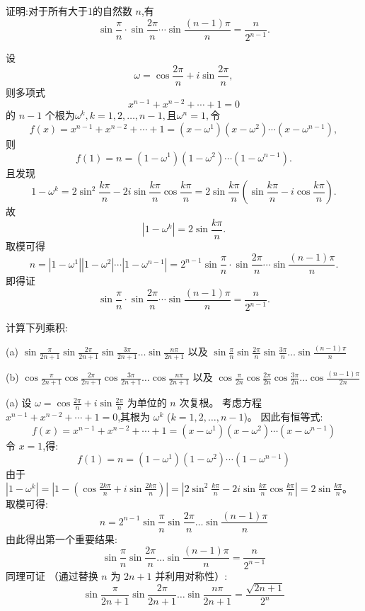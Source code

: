 \begin{questions}
    \question 证明:对于所有大于1的自然数 $n$,有
    \[
    \sin \frac{\pi}{n} \cdot \sin \frac{2\pi}{n} \cdots \sin \frac{(n-1)\pi}{n} = \frac{n}{2^{n-1}}.
    \]
    \begin{solution}
        设
        \[
        \omega = \cos \frac{2\pi}{n} + i \sin \frac{2\pi}{n},
        \]
        则多项式
        \[
        x^{n-1} + x^{n-2} + \cdots + 1 = 0
        \]的 $n-1$ 个根为$\omega^k, k=1,2,\dots,n-1,$且$\omega^n = 1,$令
        \[
        f(x) = x^{n-1} + x^{n-2} + \cdots + 1 = (x-\omega^1)(x-\omega^2)\cdots (x-\omega^{n-1}),
        \]
        则
        \[
        f(1) = n = (1-\omega^1)(1-\omega^2)\cdots (1-\omega^{n-1}).
        \]
        且发现
        \[
        1 - \omega^k = 2 \sin^2 \frac{k\pi}{n} - 2 i \sin \frac{k\pi}{n} \cos \frac{k\pi}{n} = 2 \sin \frac{k\pi}{n} \left(\sin \frac{k\pi}{n} - i \cos \frac{k\pi}{n}\right).
        \]
        故
        \[
        |1 - \omega^k| = 2 \sin \frac{k\pi}{n}.
        \]
        取模可得
        \[
        n = |1 - \omega^1||1 - \omega^2| \cdots |1 - \omega^{n-1}| = 2^{n-1} \sin \frac{\pi}{n} \cdot \sin \frac{2\pi}{n} \cdots \sin \frac{(n-1)\pi}{n}.
        \]
        即得证
        \[
        \sin \frac{\pi}{n} \cdot \sin \frac{2\pi}{n} \cdots \sin \frac{(n-1)\pi}{n} = \frac{n}{2^{n-1}}.
        \]
    \end{solution}
\question
计算下列乘积:

(a) $\sin \frac{\pi}{2n + 1} \sin \frac{2\pi}{2n + 1} \sin \frac{3\pi}{2n + 1} \dots \sin \frac{n\pi}{2n + 1}$
以及
$\sin \frac{\pi}{n} \sin \frac{2\pi}{n} \sin \frac{3\pi}{n} \dots \sin \frac{(n - 1)\pi}{n}$

(b) $\cos \frac{\pi}{2n + 1} \cos \frac{2\pi}{2n + 1} \cos \frac{3\pi}{2n + 1} \dots \cos \frac{n\pi}{2n + 1}$
以及
$\cos \frac{\pi}{2n} \cos \frac{2\pi}{2n} \cos \frac{3\pi}{2n} \dots \cos \frac{(n - 1)\pi}{2n}$

\begin{solution}
    (a) 设 $\omega = \cos \frac{2\pi}{n} + i \sin \frac{2\pi}{n}$ 为单位的 $n$ 次复根。
    考虑方程 $x^{n-1} + x^{n-2} + \cdots + 1 = 0$,其根为 $\omega^k$ ($k=1,2,\dots,n-1$)。
    因此有恒等式:
    \[ f(x) = x^{n-1} + x^{n-2} + \cdots + 1 = (x-\omega^1)(x-\omega^2)\cdots (x-\omega^{n-1}) \]
    令 $x=1$,得:
    \[ f(1) = n = (1-\omega^1)(1-\omega^2)\cdots (1-\omega^{n-1}) \]
    由于 $|1 - \omega^k| = |1 - (\cos \frac{2k\pi}{n} + i \sin \frac{2k\pi}{n})| = |2 \sin^2 \frac{k\pi}{n} - 2i \sin \frac{k\pi}{n} \cos \frac{k\pi}{n}| = 2 \sin \frac{k\pi}{n}$。
    取模可得:
    \[ n = 2^{n-1} \sin \frac{\pi}{n} \sin \frac{2\pi}{n} \dots \sin \frac{(n-1)\pi}{n} \]
    由此得出第一个重要结果:
    \[ \sin \frac{\pi}{n} \sin \frac{2\pi}{n} \dots \sin \frac{(n-1)\pi}{n} = \frac{n}{2^{n-1}} \]
    同理可证
    （通过替换 $n$ 为 $2n+1$ 并利用对称性）:
    \[ \sin \frac{\pi}{2n + 1} \sin \frac{2\pi}{2n + 1} \dots \sin \frac{n\pi}{2n + 1} = \frac{\sqrt{2n + 1}}{2^n} \]


\end{solution}
\end{questions}
